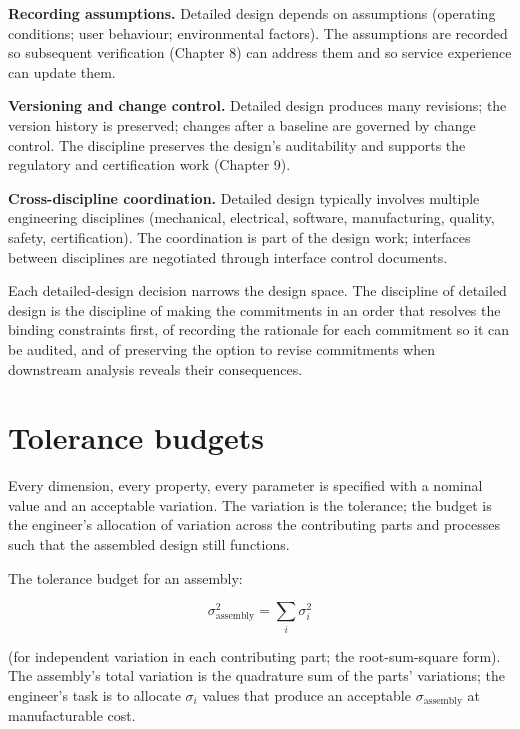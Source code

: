 \textbf{Recording assumptions.} Detailed design depends on assumptions (operating conditions; user behaviour; environmental factors). The assumptions are recorded so subsequent verification (Chapter 8) can address them and so service experience can update them.

\textbf{Versioning and change control.} Detailed design produces many revisions; the version history is preserved; changes after a baseline are governed by change control. The discipline preserves the design's auditability and supports the regulatory and certification work (Chapter 9).

\textbf{Cross-discipline coordination.} Detailed design typically involves multiple engineering disciplines (mechanical, electrical, software, manufacturing, quality, safety, certification). The coordination is part of the design work; interfaces between disciplines are negotiated through interface control documents.

\begin{principle}
Each detailed-design decision narrows the design space. The discipline of detailed design is the discipline of making the commitments in an order that resolves the binding constraints first, of recording the rationale for each commitment so it can be audited, and of preserving the option to revise commitments when downstream analysis reveals their consequences.
\end{principle}

\section{Tolerance budgets}

Every dimension, every property, every parameter is specified with a nominal value and an acceptable variation. The variation is the tolerance; the budget is the engineer's allocation of variation across the contributing parts and processes such that the assembled design still functions.

The tolerance budget for an assembly:

\[
\sigma_{\text{assembly}}^2 = \sum_i \sigma_i^2
\]

(for independent variation in each contributing part; the root-sum-square form). The assembly's total variation is the quadrature sum of the parts' variations; the engineer's task is to allocate $\sigma_i$ values that produce an acceptable $\sigma_{\text{assembly}}$ at manufacturable cost.

